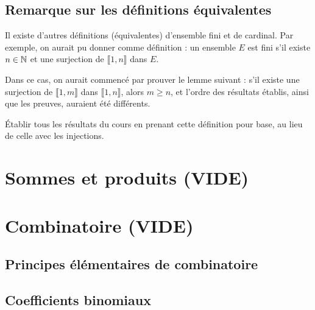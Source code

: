 \subsection{Remarque sur les définitions équivalentes}

Il existe d'autres définitions (équivalentes) d'ensemble fini et de cardinal.
Par exemple, on aurait pu donner comme définition  : un ensemble $E$ est fini s'il existe $n\in \mathbb{N}$ et une surjection de $\llbracket 1,n\rrbracket$ dans $E$.

Dans ce cas, on aurait commencé par prouver le lemme suivant : \og s'il existe une surjection de $\llbracket 1,m\rrbracket$ dans $\llbracket 1,n\rrbracket$, alors $m\geq n$\fg, et l'ordre des résultats établis, ainsi que les preuves, auraient été différents.

\begin{exercice} \'Etablir tous les résultats du cours en prenant  cette définition pour base, au lieu de celle avec les injections.
\end{exercice}

\section{Sommes et produits (VIDE)}



\section{Combinatoire (VIDE)}
\subsection{Principes élémentaires de combinatoire}
\subsection{Coefficients binomiaux}
